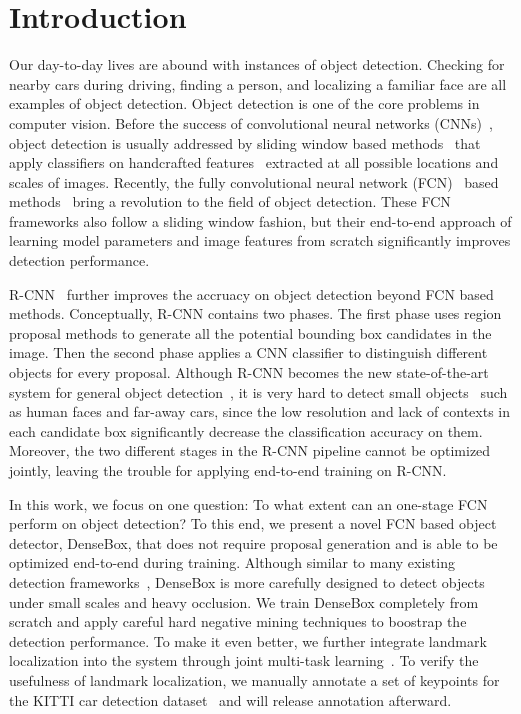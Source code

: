 \section{Introduction}

Our day-to-day lives are abound with instances of object detection. Checking for nearby cars during driving, finding a person, and localizing a familiar face are all examples of object detection. Object detection is one of the core problems in computer vision. Before the success of convolutional neural networks (CNNs)~\cite{krizhevsky2012imagenet}, object detection is usually addressed by sliding window based methods~\cite{felzenszwalb2010object, viola2004robust} that apply classifiers on handcrafted features~\cite{dalal2005histograms, lowe2004distinctive, cinbis2013segmentation} extracted at all possible locations and scales of images. Recently, the fully convolutional neural network (FCN)~\cite{long2015fully} based methods~\cite{sermanet2013overfeat, erhan2014scalable, YOLO} bring a revolution to the field of object detection. These FCN frameworks also follow a sliding window fashion, but their end-to-end approach of learning model parameters and image features from scratch significantly improves detection performance. 

R-CNN~\cite{girshick2014rich, girshick2015fast} further improves the accruacy on object detection beyond FCN based methods. Conceptually, R-CNN contains two phases. The first phase uses region proposal methods to generate all the potential bounding box candidates in the image. Then the second phase applies a CNN classifier to distinguish different objects for every proposal. Although R-CNN becomes the new state-of-the-art system for general object detection~\cite{everingham2010pascal, russakovsky2014imagenet}, it is very hard to detect small objects~\cite{pepik2015holding} such as human faces and far-away cars, since the low resolution and lack of contexts in each candidate box significantly decrease the classification accuracy on them. Moreover, the two different stages in the R-CNN pipeline cannot be optimized jointly, leaving the trouble for applying end-to-end training on R-CNN. 

In this work, we focus on one question: To what extent can an one-stage FCN perform on object detection? To this end, we present a novel FCN based object detector, DenseBox, that does not require proposal generation and is able to be optimized end-to-end during training. Although similar to many existing detection frameworks~\cite{sermanet2013overfeat, erhan2014scalable, YOLO}, DenseBox is more carefully designed to detect objects under small scales and heavy occlusion. We train DenseBox completely from scratch and apply careful hard negative mining techniques to boostrap the detection performance. To make it even better, we further integrate landmark localization into the system through joint multi-task learning~\cite{bengio2013representation}. To verify the usefulness of landmark localization, we manually annotate a set of keypoints for the KITTI car detection dataset~\cite{Geiger2012CVPR} and will release annotation afterward. 

